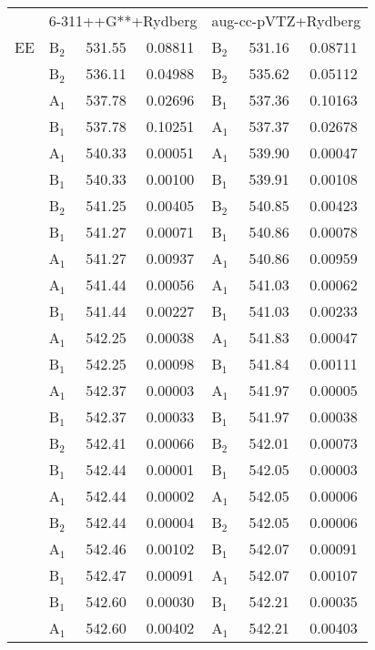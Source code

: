 \documentclass[journal=jctcce,manuscript=article]{achemso}
\begin{document}
\begin{table}
\scriptsize
\begin{tabular}{l|lcc|lcc}
\cline{1-7}
& \multicolumn{3}{c|}{6-311++G**+Rydberg}
 & \multicolumn{3}{c}{aug-cc-pVTZ+Rydberg} \\
\cline{2-7}
  EE 
  & B$_2$ & 531.55 & 0.08811      & B$_2$ & 531.16 & 0.08711 \\
& B$_2$ & 536.11 & 0.04988      & B$_2$ & 535.62 & 0.05112 \\
& A$_1$ & 537.78 & 0.02696      & B$_1$ & 537.36 & 0.10163 \\
& B$_1$ & 537.78 & 0.10251      & A$_1$ & 537.37 & 0.02678 \\
& A$_1$ & 540.33 & 0.00051      & A$_1$ & 539.90 & 0.00047 \\
& B$_1$ & 540.33 & 0.00100      & B$_1$ & 539.91 & 0.00108 \\
& B$_2$ & 541.25 & 0.00405      & B$_2$ & 540.85 & 0.00423 \\
& B$_1$ & 541.27 & 0.00071      & B$_1$ & 540.86 & 0.00078 \\
& A$_1$ & 541.27 & 0.00937      & A$_1$ & 540.86 & 0.00959 \\
& A$_1$ & 541.44 & 0.00056      & A$_1$ & 541.03 & 0.00062 \\
& B$_1$ & 541.44 & 0.00227      & B$_1$ & 541.03 & 0.00233 \\
& A$_1$ & 542.25 & 0.00038      & A$_1$ & 541.83 & 0.00047 \\
& B$_1$ & 542.25 & 0.00098      & B$_1$ & 541.84 & 0.00111 \\
& A$_1$ & 542.37 & 0.00003      & A$_1$ & 541.97 & 0.00005 \\
& B$_1$ & 542.37 & 0.00033      & B$_1$ & 541.97 & 0.00038 \\
& B$_2$ & 542.41 & 0.00066      & B$_2$ & 542.01 & 0.00073 \\
& B$_1$ & 542.44 & 0.00001      & B$_1$ & 542.05 & 0.00003 \\
& A$_1$ & 542.44 & 0.00002      & A$_1$ & 542.05 & 0.00006 \\
& B$_2$ & 542.44 & 0.00004      & B$_2$ & 542.05 & 0.00006 \\
& A$_1$ & 542.46 & 0.00102      & B$_1$ & 542.07 & 0.00091 \\
& B$_1$ & 542.47 & 0.00091      & A$_1$ & 542.07 & 0.00107 \\
& B$_1$ & 542.60 & 0.00030      & B$_1$ & 542.21 & 0.00035 \\
& A$_1$ & 542.60 & 0.00402      & A$_1$ & 542.21 & 0.00403 \\

\end{tabular}
\end{table}
\end{document}
